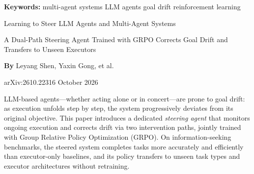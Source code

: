 \documentclass[10pt,twocolumn]{article}
\begin{document}
\setlength{\parindent}{0pt}
\setlength{\parskip}{4pt}

{\small\color{keywordgray}\textbf{Keywords:}
  multi-agent systems \textbullet{}
  LLM agents \textbullet{}
  goal drift \textbullet{}
  reinforcement learning}\par\vspace{4pt}

{\LARGE\bfseries\raggedright
  Learning to Steer LLM Agents and Multi-Agent Systems}\par\vspace{4pt}

{\large\itshape\raggedright
  A Dual-Path Steering Agent Trained with GRPO Corrects Goal Drift
  and Transfers to Unseen Executors}\par\vspace{6pt}

{\small\textbf{By} Leyang Shen, Yaxin Gong, et al.}\par\vspace{2pt}

{\small\color{keywordgray}arXiv:2610.22316 \textbullet{}
  October 2026}
\par\vspace{2pt}\noindent{\color{rulered}\rule{\columnwidth}{0.6pt}}\vspace{6pt}

LLM-based agents—whether acting alone or in concert—are prone to goal
drift: as execution unfolds step by step, the system progressively deviates
from its original objective. This paper introduces a dedicated \textit{steering
agent} that monitors ongoing execution and corrects drift via two intervention
paths, jointly trained with Group Relative Policy Optimization (GRPO). On
information-seeking benchmarks, the steered system completes tasks more
accurately and efficiently than executor-only baselines, and its policy
transfers to unseen task types and executor architectures without retraining.
\end{document}
